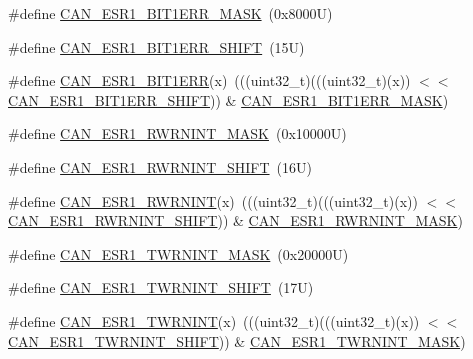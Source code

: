 \begin{DoxyCompactItemize}
\item 
\#define \mbox{\hyperlink{group___c_a_n___register___masks_ga8a260202c5a157354042a1fba8cbc882}{C\+A\+N\+\_\+\+E\+S\+R1\+\_\+\+B\+I\+T1\+E\+R\+R\+\_\+\+M\+A\+SK}}~(0x8000\+U)
\item 
\#define \mbox{\hyperlink{group___c_a_n___register___masks_ga2118504746ecc7ba810d5ed44dd7c31f}{C\+A\+N\+\_\+\+E\+S\+R1\+\_\+\+B\+I\+T1\+E\+R\+R\+\_\+\+S\+H\+I\+FT}}~(15\+U)
\item 
\#define \mbox{\hyperlink{group___c_a_n___register___masks_gac50dc3655aa3483ccb1a465c9338620f}{C\+A\+N\+\_\+\+E\+S\+R1\+\_\+\+B\+I\+T1\+E\+RR}}(x)~(((uint32\+\_\+t)(((uint32\+\_\+t)(x)) $<$$<$ \mbox{\hyperlink{group___c_a_n___register___masks_ga2118504746ecc7ba810d5ed44dd7c31f}{C\+A\+N\+\_\+\+E\+S\+R1\+\_\+\+B\+I\+T1\+E\+R\+R\+\_\+\+S\+H\+I\+FT}})) \& \mbox{\hyperlink{group___c_a_n___register___masks_ga8a260202c5a157354042a1fba8cbc882}{C\+A\+N\+\_\+\+E\+S\+R1\+\_\+\+B\+I\+T1\+E\+R\+R\+\_\+\+M\+A\+SK}})
\item 
\#define \mbox{\hyperlink{group___c_a_n___register___masks_gaf0e71745a764581c68a93feef2db8602}{C\+A\+N\+\_\+\+E\+S\+R1\+\_\+\+R\+W\+R\+N\+I\+N\+T\+\_\+\+M\+A\+SK}}~(0x10000\+U)
\item 
\#define \mbox{\hyperlink{group___c_a_n___register___masks_gafcbf44277d9766061369a79e2ff761a2}{C\+A\+N\+\_\+\+E\+S\+R1\+\_\+\+R\+W\+R\+N\+I\+N\+T\+\_\+\+S\+H\+I\+FT}}~(16\+U)
\item 
\#define \mbox{\hyperlink{group___c_a_n___register___masks_gad4786fdb84553aef3953ab49c79d5f36}{C\+A\+N\+\_\+\+E\+S\+R1\+\_\+\+R\+W\+R\+N\+I\+NT}}(x)~(((uint32\+\_\+t)(((uint32\+\_\+t)(x)) $<$$<$ \mbox{\hyperlink{group___c_a_n___register___masks_gafcbf44277d9766061369a79e2ff761a2}{C\+A\+N\+\_\+\+E\+S\+R1\+\_\+\+R\+W\+R\+N\+I\+N\+T\+\_\+\+S\+H\+I\+FT}})) \& \mbox{\hyperlink{group___c_a_n___register___masks_gaf0e71745a764581c68a93feef2db8602}{C\+A\+N\+\_\+\+E\+S\+R1\+\_\+\+R\+W\+R\+N\+I\+N\+T\+\_\+\+M\+A\+SK}})
\item 
\#define \mbox{\hyperlink{group___c_a_n___register___masks_gaf6b96813ed300d4649d7daec40351861}{C\+A\+N\+\_\+\+E\+S\+R1\+\_\+\+T\+W\+R\+N\+I\+N\+T\+\_\+\+M\+A\+SK}}~(0x20000\+U)
\item 
\#define \mbox{\hyperlink{group___c_a_n___register___masks_ga651c6aee47d004060a9dbc10369cf784}{C\+A\+N\+\_\+\+E\+S\+R1\+\_\+\+T\+W\+R\+N\+I\+N\+T\+\_\+\+S\+H\+I\+FT}}~(17\+U)
\item 
\#define \mbox{\hyperlink{group___c_a_n___register___masks_ga613a68f6979e2a2ddef3a23e92ab1d72}{C\+A\+N\+\_\+\+E\+S\+R1\+\_\+\+T\+W\+R\+N\+I\+NT}}(x)~(((uint32\+\_\+t)(((uint32\+\_\+t)(x)) $<$$<$ \mbox{\hyperlink{group___c_a_n___register___masks_ga651c6aee47d004060a9dbc10369cf784}{C\+A\+N\+\_\+\+E\+S\+R1\+\_\+\+T\+W\+R\+N\+I\+N\+T\+\_\+\+S\+H\+I\+FT}})) \& \mbox{\hyperlink{group___c_a_n___register___masks_gaf6b96813ed300d4649d7daec40351861}{C\+A\+N\+\_\+\+E\+S\+R1\+\_\+\+T\+W\+R\+N\+I\+N\+T\+\_\+\+M\+A\+SK}})
$$
\end{DoxyCompactItemize}
